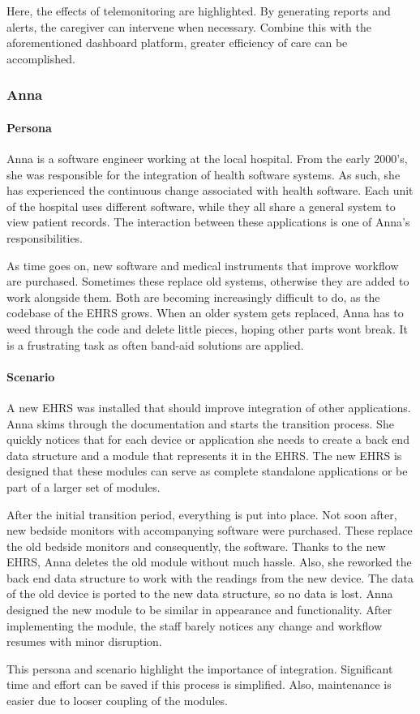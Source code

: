         \noindent Here, the effects of telemonitoring are highlighted. By generating reports and alerts, the caregiver can intervene when necessary. Combine this with the aforementioned dashboard platform, greater efficiency of care can be accomplished.

        \subsubsection{Anna}

        \paragraph{Persona} Anna is a software engineer working at the local hospital. From the early 2000's, she was responsible for the integration of health software systems. As such, she has experienced the continuous change associated with health software. Each unit of the hospital uses different software, while they all share a general system to view patient records. The interaction between these applications is one of Anna's responsibilities.

        As time goes on, new software and medical instruments that improve workflow are purchased. Sometimes these replace old systems, otherwise they are added to work alongside them. Both are becoming increasingly difficult to do, as the codebase of the EHRS grows. When an older system gets replaced, Anna has to weed through the code and delete little pieces, hoping other parts wont break. It is a frustrating task as often band-aid solutions are applied.

        \paragraph{Scenario} A new EHRS was installed that should improve integration of other applications. Anna skims through the documentation and starts the transition process. She quickly notices that for each device or application she needs to create a back end data structure and a module that represents it in the EHRS\@. The new EHRS is designed that these modules can serve as complete standalone applications or be part of a larger set of modules.

        After the initial transition period, everything is put into place. Not soon after, new bedside monitors with accompanying software were purchased. These replace the old bedside monitors and consequently, the software. Thanks to the new EHRS, Anna deletes the old module without much hassle. Also, she reworked the back end data structure to work with the readings from the new device. The data of the old device is ported to the new data structure, so no data is lost. Anna designed the new module to be similar in appearance and functionality. After implementing the module, the staff barely notices any change and workflow resumes with minor disruption.\bigskip

        \noindent This persona and scenario highlight the importance of integration. Significant time and effort can be saved if this process is simplified. Also, maintenance is easier due to looser coupling of the modules.

    